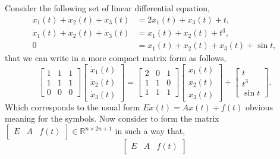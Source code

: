 		\begin{example}
			Consider the following set of linear differential equation, 
			\begin{subequations}
				\begin{align}
					\dot{x}_{1}(t) + \dot{x}_{2}(t) + \dot{x}_{3}(t) &= 2x_{1}(t) + x_{3}(t) + t, \\
					\dot{x}_{1}(t) + \dot{x}_{2}(t) + \dot{x}_{3}(t) &= x_{1}(t) + x_{2}(t) + t^{3}, \\
					0 &= x_{1}(t) + x_{2}(t) + x_{3}(t) + \sin{t},
				\end{align}
			\end{subequations}
			that we can write in a more compact matrix form as follows,
			\begin{equation}
				\begin{bmatrix}
					1 & 1 & 1 \\
					1 & 1 & 1 \\
					0 & 0 & 0
				\end{bmatrix}
				\begin{bmatrix}
					\dot{x}_{1}(t)\\
					\dot{x}_{2}(t)\\
					\dot{x}_{3}(t)
				\end{bmatrix}
				= 
				\begin{bmatrix}
					2 & 0 & 1\\
					1 & 1 & 0\\
					1 & 1 & 1
				\end{bmatrix}
				\begin{bmatrix}
					x_{1}(t) \\
					x_{2}(t) \\
					x_{3}(t)
				\end{bmatrix}
				+
				\begin{bmatrix}
					t \\
					t^3 \\
					\sin{t}
				\end{bmatrix}.
			\end{equation}
			Which corresponds to the usual form $E\dot{x}(t) = Ax(t) + f(t)$ obvious meaning for the symbols. Now consider to form the matrix $\begin{bmatrix}E & A & f(t) \end{bmatrix}\in\mathbb{R}^{n\times 2 n+1}$ in such a way that, 
			\begin{equation}
				\begin{bmatrix}
					E & A & f(t)
				\end{bmatrix}

\end{equation}
\end{example}
